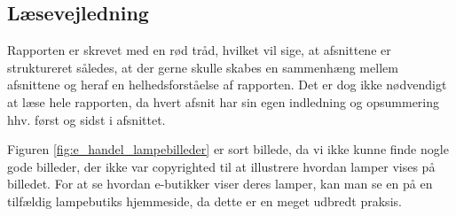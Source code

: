 \subsection{Læsevejledning}
Rapporten er skrevet med en rød tråd, hvilket vil sige, at afsnittene er struktureret således, at der gerne skulle skabes en sammenhæng mellem afsnittene og heraf en helhedsforståelse af rapporten. Det er dog ikke nødvendigt at læse hele rapporten, da hvert afsnit har sin egen indledning og opsummering hhv. først og sidst i afsnittet. 

Figuren \ref{fig:e_handel_lampebilleder} er sort billede, da vi ikke kunne finde nogle gode billeder, der ikke var copyrighted til at illustrere hvordan lamper vises på billedet. For at se hvordan e-butikker viser deres lamper, kan man se en på en tilfældig lampebutiks hjemmeside, da dette er en meget udbredt praksis. 




